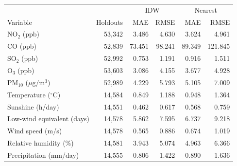\begin{tabular}{@{}lrrrrr@{}}
\toprule
& & \multicolumn{2}{c}{IDW} & \multicolumn{2}{c}{Nearest}\\
Variable & Holdouts & MAE & RMSE & MAE & RMSE\\
\midrule
NO$_2$ (ppb) & 53,342 & 3.486 & 4.630 & 3.624 & 4.961\\
CO (ppb) & 52,839 & 73.451 & 98.241 & 89.349 & 121.845\\
SO$_2$ (ppb) & 52,992 & 0.753 & 1.191 & 0.916 & 1.511\\
O$_3$ (ppb) & 53,603 & 3.086 & 4.155 & 3.677 & 4.928\\
PM$_{10}$ ($\mu$g/m$^3$) & 52,989 & 4.229 & 5.793 & 5.105 & 7.009\\
Temperature ($^\circ$C) & 14,584 & 0.849 & 1.188 & 0.948 & 1.364\\
Sunshine (h/day) & 14,551 & 0.462 & 0.617 & 0.568 & 0.759\\
Low-wind equivalent (days) & 14,578 & 5.862 & 7.595 & 6.737 & 9.218\\
Wind speed (m/s) & 14,578 & 0.565 & 0.886 & 0.674 & 1.019\\
Relative humidity (\%) & 14,581 & 3.943 & 5.074 & 4.963 & 6.366\\
Precipitation (mm/day) & 14,555 & 0.806 & 1.422 & 0.890 & 1.636\\
\bottomrule
\end{tabular}
